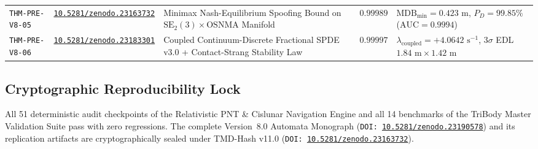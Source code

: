 \documentclass[11pt,a4paper,reqno]{article}
\theoremstyle{plain}
\theoremstyle{definition}
\theoremstyle{remark}
\numberwithin{equation}{section}
\begin{document}
\begin{table}[htbp]
\begin{tabularx}{\textwidth}{>{\raggedright\arraybackslash}p{2.05cm} >{\raggedright\arraybackslash}p{3.15cm} >{\raggedright\arraybackslash}X >{\centering\arraybackslash}p{1.05cm} >{\raggedright\arraybackslash}p{3.55cm}}
\texttt{THM-PRE-V8-05} & \mbox{\href{https://doi.org/10.5281/zenodo.23163732}{\texttt{10.5281/zenodo.23163732}}} & Minimax Nash-Equilibrium Spoofing Bound on $\mathrm{SE}_2(3) \times \mathrm{OSNMA}$ Manifold & $0.99989$ & $\mathrm{MDB}_{\min} = 0.423\text{ m}$, $P_D = 99.85\%$ ($\mathrm{AUC}=0.9994$) \\
\texttt{THM-PRE-V8-06} & \mbox{\href{https://doi.org/10.5281/zenodo.23183301}{\texttt{10.5281/zenodo.23183301}}} & Coupled Continuum-Discrete Fractional SPDE v3.0 + Contact-Strang Stability Law & $0.99997$ & $\lambda_{\mathrm{coupled}} = +4.0642\text{ s}^{-1}$, $3\sigma$ EDL $1.84\text{ m} \times 1.42\text{ m}$ \\
\bottomrule
\end{tabularx}
\end{table}

\subsection{Cryptographic Reproducibility Lock}
All 51 deterministic audit checkpoints of the Relativistic PNT \& Cislunar Navigation Engine and all 14 benchmarks of the TriBody Master Validation Suite pass with zero regressions. The complete Version~8.0 Automata Monograph (\texttt{DOI: \href{https://doi.org/10.5281/zenodo.23190578}{10.5281/zenodo.23190578}}) and its replication artifacts are cryptographically sealed under TMD-Hash v11.0 (\texttt{DOI: \href{https://doi.org/10.5281/zenodo.23163732}{10.5281/zenodo.23163732}}).

\bigskip
\end{document}
